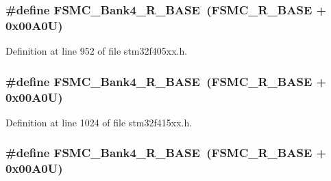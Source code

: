 \subsubsection[{\texorpdfstring{F\+S\+M\+C\+\_\+\+Bank4\+\_\+\+R\+\_\+\+B\+A\+SE}{FSMC_Bank4_R_BASE}}]{\setlength{\rightskip}{0pt plus 5cm}\#define F\+S\+M\+C\+\_\+\+Bank4\+\_\+\+R\+\_\+\+B\+A\+SE~({\bf F\+S\+M\+C\+\_\+\+R\+\_\+\+B\+A\+SE} + 0x00\+A0\+U)}\hypertarget{group___peripheral__registers__structures_gaf9e5417133160b0bdd0498d982acec19}{}\label{group___peripheral__registers__structures_gaf9e5417133160b0bdd0498d982acec19}


Definition at line 952 of file stm32f405xx.\+h.

\subsubsection[{\texorpdfstring{F\+S\+M\+C\+\_\+\+Bank4\+\_\+\+R\+\_\+\+B\+A\+SE}{FSMC_Bank4_R_BASE}}]{\setlength{\rightskip}{0pt plus 5cm}\#define F\+S\+M\+C\+\_\+\+Bank4\+\_\+\+R\+\_\+\+B\+A\+SE~({\bf F\+S\+M\+C\+\_\+\+R\+\_\+\+B\+A\+SE} + 0x00\+A0\+U)}\hypertarget{group___peripheral__registers__structures_gaf9e5417133160b0bdd0498d982acec19}{}\label{group___peripheral__registers__structures_gaf9e5417133160b0bdd0498d982acec19}


Definition at line 1024 of file stm32f415xx.\+h.

\subsubsection[{\texorpdfstring{F\+S\+M\+C\+\_\+\+Bank4\+\_\+\+R\+\_\+\+B\+A\+SE}{FSMC_Bank4_R_BASE}}]{\setlength{\rightskip}{0pt plus 5cm}\#define F\+S\+M\+C\+\_\+\+Bank4\+\_\+\+R\+\_\+\+B\+A\+SE~({\bf F\+S\+M\+C\+\_\+\+R\+\_\+\+B\+A\+SE} + 0x00\+A0\+U)}\hypertarget{group___peripheral__registers__structures_gaf9e5417133160b0bdd0498d982acec19}{}\label{group___peripheral__registers__structures_gaf9e5417133160b0bdd0498d982acec19}


